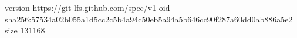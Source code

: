 version https://git-lfs.github.com/spec/v1
oid sha256:57534a02b055a1d5cc2c5b4a94c50eb5a94a5b646cc90f287a60dd0ab886a5e2
size 131168

